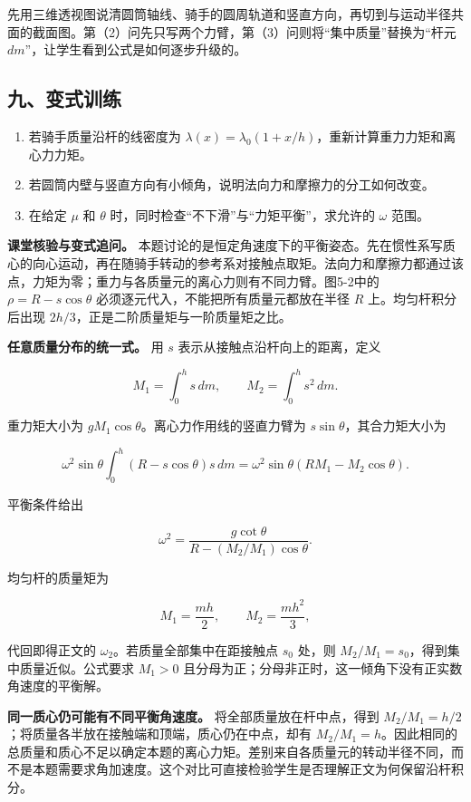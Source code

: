 \documentclass[12pt,a4paper,UTF8]{ctexart}
\newcommand{\tightlist}{\setlength{\itemsep}{0pt}\setlength{\parskip}{0pt}}
\begin{document}
先用三维透视图说清圆筒轴线、骑手的圆周轨道和竖直方向，再切到与运动半径共面的截面图。第（2）问先只写两个力臂，第（3）问则将``集中质量''替换为``杆元
\(dm\)''，让学生看到公式是如何逐步升级的。

\subsection{九、变式训练}\label{ux4e5dux53d8ux5f0fux8badux7ec3-4}

\begin{enumerate}
\def\labelenumi{\arabic{enumi}.}
\tightlist
\item
  若骑手质量沿杆的线密度为
  \(\lambda(x)=\lambda_0(1+x/h)\)，重新计算重力力矩和离心力力矩。
\item
  若圆筒内壁与竖直方向有小倾角，说明法向力和摩擦力的分工如何改变。
\item
  在给定 \(\mu\) 和 \(\theta\)
  时，同时检查``不下滑''与``力矩平衡''，求允许的 \(\omega\) 范围。
\end{enumerate}

\textbf{课堂核验与变式追问。}
本题讨论的是恒定角速度下的平衡姿态。先在惯性系写质心的向心运动，再在随骑手转动的参考系对接触点取矩。法向力和摩擦力都通过该点，力矩为零；重力与各质量元的离心力则有不同力臂。图5-2中的
\(\rho=R-s\cos\theta\) 必须逐元代入，不能把所有质量元都放在半径 \(R\)
上。均匀杆积分后出现 \(2h/3\)，正是二阶质量矩与一阶质量矩之比。

\textbf{任意质量分布的统一式。} 用 \(s\)
表示从接触点沿杆向上的距离，定义

\[
M_1=\int_0^h s\,dm,\qquad M_2=\int_0^h s^2\,dm.
\]

重力矩大小为 \(gM_1\cos\theta\)。离心力作用线的竖直力臂为
\(s\sin\theta\)，其合力矩大小为

\[
\omega^2\sin\theta\int_0^h(R-s\cos\theta)s\,dm
=\omega^2\sin\theta(RM_1-M_2\cos\theta).
\]

平衡条件给出

\[
\boxed{\omega^2=\frac{g\cot\theta}{R-(M_2/M_1)\cos\theta}}.
\]

均匀杆的质量矩为

\[M_1=\frac{mh}{2},\qquad M_2=\frac{mh^2}{3},\]

代回即得正文的 \(\omega_2\)。若质量全部集中在距接触点 \(s_0\) 处，则
\(M_2/M_1=s_0\)，得到集中质量近似。公式要求 \(M_1>0\)
且分母为正；分母非正时，这一倾角下没有正实数角速度的平衡解。

\textbf{同一质心仍可能有不同平衡角速度。} 将全部质量放在杆中点，得到
\(M_2/M_1=h/2\)；将质量各半放在接触端和顶端，质心仍在中点，却有
\(M_2/M_1=h\)。因此相同的总质量和质心不足以确定本题的离心力矩。差别来自各质量元的转动半径不同，而不是本题需要求角加速度。这个对比可直接检验学生是否理解正文为何保留沿杆积分。
\end{document}

